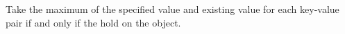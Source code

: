 Take the maximum of the specified value and existing value for each key-value
pair if and only if the  hold on the object.



